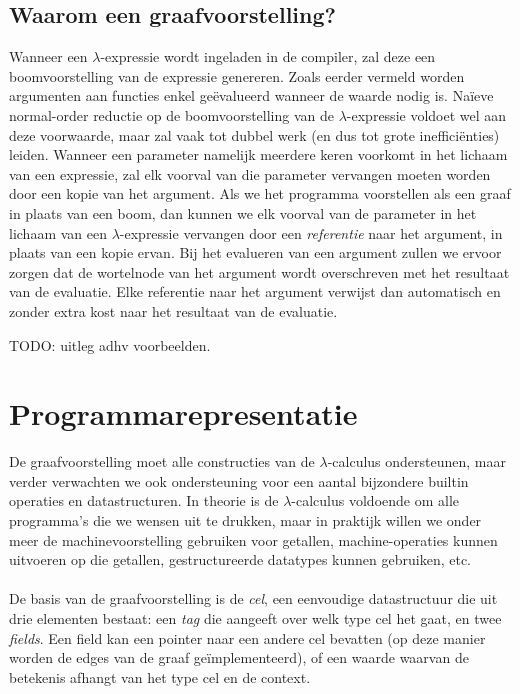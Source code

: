 \documentclass[a4paper,10pt]{article}
\begin{document}
\subsection{Waarom een graafvoorstelling?}
Wanneer een $\lambda$-expressie wordt ingeladen in de compiler, zal deze een boomvoorstelling van de expressie genereren.
Zoals eerder vermeld worden argumenten aan functies enkel ge{\"e}valueerd wanneer de waarde nodig is.
Na{\"i}eve normal-order reductie op de boomvoorstelling van de $\lambda$-expressie voldoet wel aan deze voorwaarde, maar zal vaak tot dubbel werk (en dus tot grote ineffici{\"e}nties) leiden.
Wanneer een parameter namelijk meerdere keren voorkomt in het lichaam van een expressie, zal elk voorval van die parameter vervangen moeten worden door een kopie van het argument.
Als we het programma voorstellen als een graaf in plaats van een boom, dan kunnen we elk voorval van de parameter in het lichaam van een $\lambda$-expressie vervangen door een \emph{referentie} naar het argument, in plaats van een kopie ervan.
Bij het evalueren van een argument zullen we ervoor zorgen dat de wortelnode van het argument wordt overschreven met het resultaat van de evaluatie.
Elke referentie naar het argument verwijst dan automatisch en zonder extra kost naar het resultaat van de evaluatie.

TODO: uitleg adhv voorbeelden.


\section{Programmarepresentatie}
De graafvoorstelling moet alle constructies van de $\lambda$-calculus ondersteunen, maar verder verwachten we ook ondersteuning voor een aantal bijzondere builtin operaties en datastructuren.
In theorie is de $\lambda$-calculus voldoende om alle programma's die we wensen uit te drukken, maar in praktijk willen we onder meer de machinevoorstelling gebruiken voor getallen, machine-operaties kunnen uitvoeren op die getallen, gestructureerde datatypes kunnen gebruiken, etc.
\paragraph{}
De basis van de graafvoorstelling is de \emph{cel}, een eenvoudige datastructuur die uit drie elementen bestaat: een \emph{tag} die aangeeft over welk type cel het gaat, en twee \emph{fields}.
Een field kan een pointer naar een andere cel bevatten (op deze manier worden de edges van de graaf ge{\"i}mplementeerd), of een waarde waarvan de betekenis afhangt van het type cel en de context.
\end{document}
